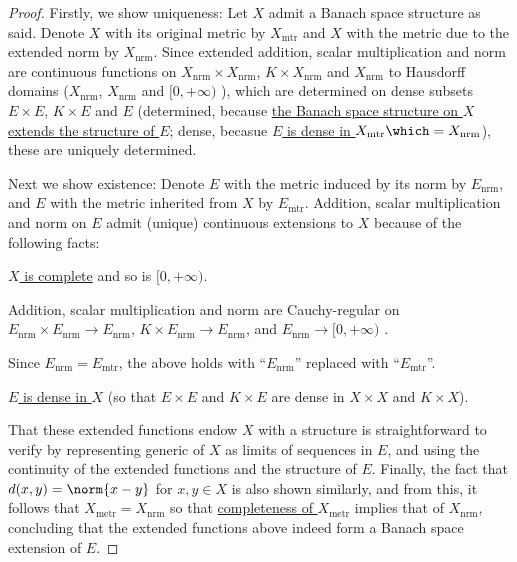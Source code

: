 	\begin{proof}
		Firstly, we show uniqueness: Let $X$ admit a Banach space structure as said. Denote $X$ with its original metric  by $X_\text{mtr}$ and $X$ with the metric due to the extended norm by $X_\text{nrm}$. Since extended addition, scalar multiplication and norm are continuous functions \resp on $X_\text{nrm}\times X_\text{nrm}$, $K\times X_\text{nrm}$ and $X_\text{nrm}$ to Hausdorff domains ($X_\text{nrm}$, $X_\text{nrm}$ and $[0, +\infty)$ \resp), which are determined on dense subsets $E\times E$, $K\times E$ and $E$ \resp (determined, because \uline{the Banach space structure on $X$ extends the \NLS structure of $E$}; dense, becasue \uline{$E$ is dense in $X_\text{mtr}\which = X_\text{nrm}$}), these are uniquely determined.
		
		Next we show existence: Denote $E$ with the metric induced by its norm by $E_\text{nrm}$, and $E$ with the metric inherited from $X$ by $E_\text{mtr}$. Addition, scalar multiplication and norm on $E$ admit (unique) continuous extensions to $X$ because of the following facts:
		\begin{mylist}
			\item \uline{$X$ is complete} and so is $[0, +\infty)$.
			
			\item Addition, scalar multiplication and norm are Cauchy-regular on $E_\text{nrm}\times E_\text{nrm}\to E_\text{nrm}$, $K\times E_\text{nrm}\to E_\text{nrm}$, and $E_\text{nrm}\to[0, +\infty)$ \resp.
			
			\item Since \uline{$E_\text{nrm} = E_\text{mtr}$}, the above holds with ``$E_\text{nrm}$'' replaced with ``$E_\text{mtr}$''.
			
			\item \uline{$E$ is dense in $X$} (so that $E\times E$ and $K\times E$ are \resp dense in $X\times X$ and $K\times X$).
		\end{mylist}
		That these extended functions endow $X$ with a \NLS structure is straightforward to verify by representing generic  of $X$ as limits of sequences in $E$, and using the continuity of the extended functions and the \NLS structure of $E$. Finally, the fact that $d(x, y) = \norm{x - y}$ for $x, y\in X$ is also shown similarly, and from this, it follows that $X_\text{metr} = X_\text{nrm}$ so that \uline{completeness of $X_\text{metr}$} implies that of $X_\text{nrm}$, concluding that the extended functions above indeed form a Banach space extension of $E$.
	\end{proof}
	
